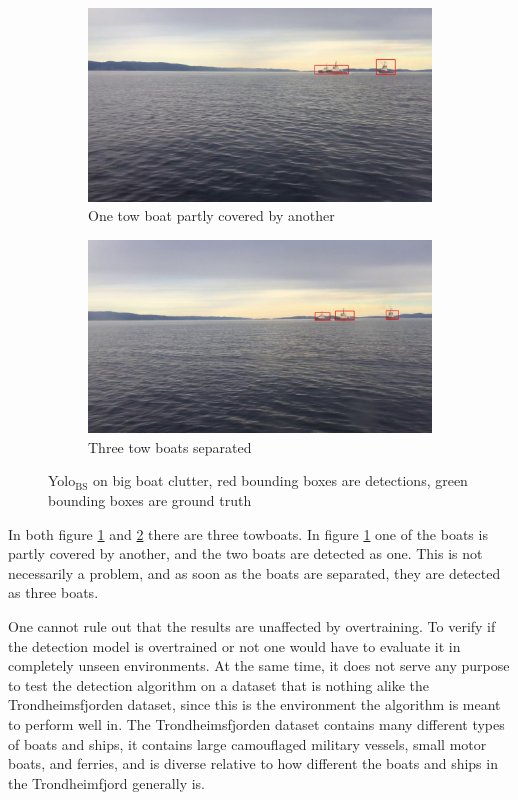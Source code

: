\begin{figure}[h!]
\begin{subfigure}{.5\textwidth}
  \centering
  \includegraphics[width=0.8\linewidth]{results/video/video3/frame479.jpg}
  \caption{One tow boat partly covered by another}
  \label{fig:yolo1_clut_tow}
\end{subfigure}%
\begin{subfigure}{.5\textwidth}
  \centering
  \includegraphics[width=.8\linewidth]{results/video/video3/frame677.jpg}
  \caption{Three tow boats separated}
  \label{fig:yolo1_sep}
\end{subfigure}
\caption{Yolo$_{\text{BS}}$ on big boat clutter, red bounding boxes are detections, green bounding boxes are ground truth}
\label{fig:yolo1_clutter}
\end{figure}

In both figure \ref{fig:yolo1_clut_tow} and \ref{fig:yolo1_sep} there are three towboats. In figure \ref{fig:yolo1_clut_tow} one of the boats is partly covered by another, and the two boats are detected as one. This is not necessarily a problem, and as soon as the boats are separated, they are detected as three boats. 

\vspace{3mm}

One cannot rule out that the results are unaffected by overtraining. To verify if the detection model is overtrained or not one would have to evaluate it in completely unseen environments. At the same time, it does not serve any purpose to test the detection algorithm on a dataset that is nothing alike the Trondheimsfjorden dataset, since this is the environment the algorithm is meant to perform well in. The Trondheimsfjorden dataset contains many different types of boats and ships, it contains large camouflaged military vessels, small motor boats, and ferries, and is diverse relative to how different the boats and ships in the Trondheimfjord generally is. 

